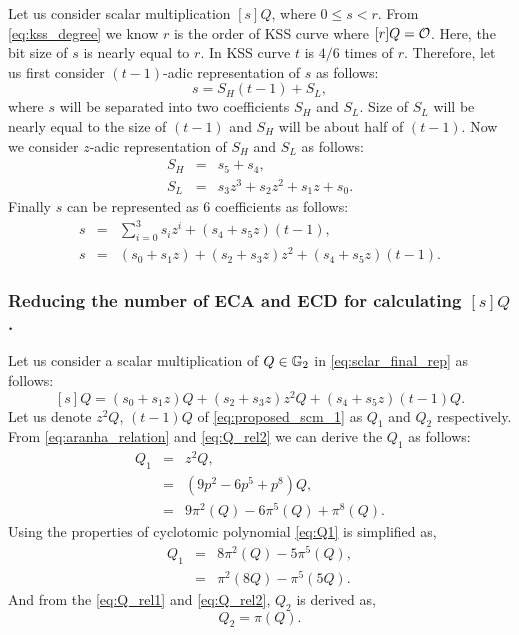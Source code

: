 Let us consider scalar multiplication $[s]Q$, where $0 \leq s < r$. From \eqref{eq:kss_degree} we know $r$ is the order of KSS curve  where $[r]Q=\cal O$. Here, the bit size of $s$ is nearly equal to $r$. In KSS curve $t$ is  $4/6$ times of  $r$. Therefore, let us first consider $(t-1)$-adic representation of $s$ as follows:
\begin{equation}\label{eq:t-1_adic}
s =  S_H(t-1)+S_L,
\end{equation}
where $s$ will be separated into two coefficients $S_H$ and $S_L$.  Size of $S_L$ will be nearly equal to the size of $(t-1)$ and $S_H$ will be about half of $(t-1)$. 
Now we consider $z$-adic representation of $S_H$ and $S_L$ as follows:
\begin{eqnarray}\label{eq:scalar_mul_Q}
S_H & =  & s_5+ s_4,\nonumber \\
S_L & = & s_3 z^3+s_2 z^2+s_1 z+s_0.\nonumber 
\end{eqnarray}
Finally $s$ can be represented as 6 coefficients as follows:
\begin{eqnarray}\label{eq:sclar_final_rep}
s & =  & \sum_{i=0}^{3} s_iz^i + (s_4+s_5z)(t-1),\nonumber \\
s & = & (s_0+s_1z) + (s_2 +s_3z)z^2 +(s_4+s_5z)(t-1).
\end{eqnarray}

\subsubsection{Reducing the number of ECA and ECD for calculating $[s]Q$.}
Let us consider a scalar multiplication of $Q \in {\mathbb{G}}_{2}$ in \eqref{eq:sclar_final_rep} as follows:
\begin{equation}\label{eq:proposed_scm_1}
[s]Q =  (s_0+s_1z)Q + (s_2 +s_3z)z^2Q +(s_4+s_5z)(t-1)Q.
\end{equation}
Let us denote $z^2Q$, $(t-1)Q$ of \eqref{eq:proposed_scm_1} as $Q_1$ and $Q_2$ respectively. From \eqref{eq:aranha_relation} and \eqref{eq:Q_rel2} we can derive the $Q_1$ as follows:
\begin{eqnarray}\label{eq:Q1}
Q_1& = & z^2 Q, \nonumber \\
& = & (9p^2-6p^5+p^8)Q,\nonumber \\
& = & 9\pi^2(Q)-6\pi^5(Q)+\pi^8(Q).
\end{eqnarray}
Using the properties of cyclotomic polynomial \eqref{eq:Q1} is simplified as,
\begin{eqnarray}\label{eq:Q1.1}
Q_1 & = & 8\pi^2(Q)-5\pi^5(Q),  \nonumber\\
& = & \pi^2(8Q)-\pi^5(5Q). 
\end{eqnarray}
And from the \eqref{eq:Q_rel1} and \eqref{eq:Q_rel2}, $Q_2$ is derived as,
\begin{equation}\label{eq:proposed_scm_2}
Q_2 = \pi (Q).
\end{equation}

